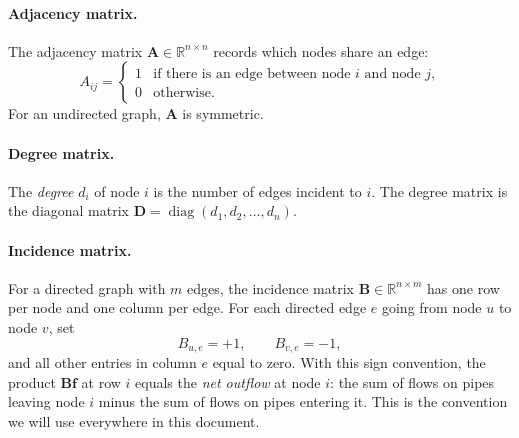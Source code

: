 \documentclass[11pt,a4paper]{article}
\newcommand{\RR}{\mathbb{R}}
\newcommand{\mat}[1]{\mathbf{#1}}
\newcommand{\vect}[1]{\mathbf{#1}}
\begin{document}
\paragraph{Adjacency matrix.}
The adjacency matrix $\mat{A} \in \RR^{n \times n}$ records which nodes
share an edge:
\[
A_{ij} =
\begin{cases}
  1 & \text{if there is an edge between node $i$ and node $j$,} \\
  0 & \text{otherwise.}
\end{cases}
\]
For an undirected graph, $\mat{A}$ is symmetric.

\paragraph{Degree matrix.}
The \emph{degree} $d_i$ of node $i$ is the number of edges incident to
$i$. The degree matrix is the diagonal matrix
$\mat{D} = \operatorname{diag}(d_1, d_2, \ldots, d_n)$.

\paragraph{Incidence matrix.}
For a directed graph with $m$ edges, the incidence matrix
$\mat{B} \in \RR^{n \times m}$ has one row per node and one column per
edge. For each directed edge $e$ going from node $u$ to node $v$, set
\[
B_{u,e} = +1, \qquad B_{v,e} = -1,
\]
and all other entries in column $e$ equal to zero. With this sign
convention, the product $\mat{B}\vect{f}$ at row $i$ equals the
\emph{net outflow} at node $i$: the sum of flows on pipes leaving node
$i$ minus the sum of flows on pipes entering it. This is the
convention we will use everywhere in this document.
\end{document}
